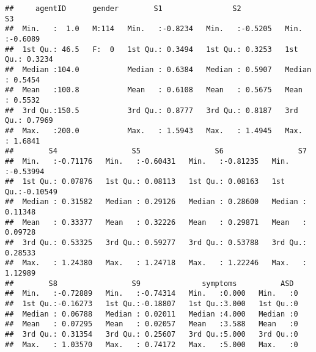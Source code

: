 \documentclass[]{article}
\newenvironment{Shaded}{\begin{snugshade}}{\end{snugshade}}
\newcommand{\KeywordTok}[1]{\textcolor[rgb]{0.13,0.29,0.53}{\textbf{#1}}}
\newcommand{\StringTok}[1]{\textcolor[rgb]{0.31,0.60,0.02}{#1}}
\newcommand{\CommentTok}[1]{\textcolor[rgb]{0.56,0.35,0.01}{\textit{#1}}}
\newcommand{\OperatorTok}[1]{\textcolor[rgb]{0.81,0.36,0.00}{\textbf{#1}}}
\newcommand{\NormalTok}[1]{#1}
\begin{document}
\begin{verbatim}
##     agentID      gender        S1                S2                S3         
##  Min.   :  1.0   M:114   Min.   :-0.8234   Min.   :-0.5205   Min.   :-0.6089  
##  1st Qu.: 46.5   F:  0   1st Qu.: 0.3494   1st Qu.: 0.3253   1st Qu.: 0.3234  
##  Median :104.0           Median : 0.6384   Median : 0.5907   Median : 0.5454  
##  Mean   :100.8           Mean   : 0.6108   Mean   : 0.5675   Mean   : 0.5532  
##  3rd Qu.:150.5           3rd Qu.: 0.8777   3rd Qu.: 0.8187   3rd Qu.: 0.7969  
##  Max.   :200.0           Max.   : 1.5943   Max.   : 1.4945   Max.   : 1.6841  
##        S4                 S5                 S6                 S7          
##  Min.   :-0.71176   Min.   :-0.60431   Min.   :-0.81235   Min.   :-0.53994  
##  1st Qu.: 0.07876   1st Qu.: 0.08113   1st Qu.: 0.08163   1st Qu.:-0.10549  
##  Median : 0.31582   Median : 0.29126   Median : 0.28600   Median : 0.11348  
##  Mean   : 0.33377   Mean   : 0.32226   Mean   : 0.29871   Mean   : 0.09728  
##  3rd Qu.: 0.53325   3rd Qu.: 0.59277   3rd Qu.: 0.53788   3rd Qu.: 0.28533  
##  Max.   : 1.24380   Max.   : 1.24718   Max.   : 1.22246   Max.   : 1.12989  
##        S8                 S9              symptoms          ASD   
##  Min.   :-0.72889   Min.   :-0.74314   Min.   :0.000   Min.   :0  
##  1st Qu.:-0.16273   1st Qu.:-0.18807   1st Qu.:3.000   1st Qu.:0  
##  Median : 0.06788   Median : 0.02011   Median :4.000   Median :0  
##  Mean   : 0.07295   Mean   : 0.02057   Mean   :3.588   Mean   :0  
##  3rd Qu.: 0.31354   3rd Qu.: 0.25607   3rd Qu.:5.000   3rd Qu.:0  
##  Max.   : 1.03570   Max.   : 0.74172   Max.   :5.000   Max.   :0
\end{verbatim}

\begin{Shaded}
\end{Shaded}
\end{document}
